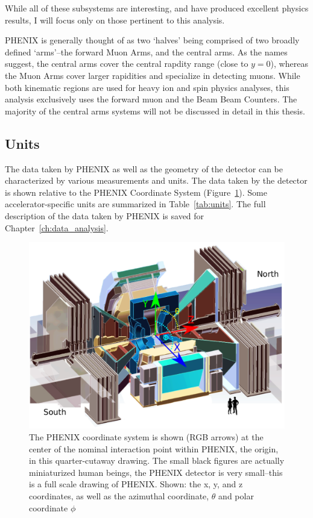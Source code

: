 While all of these subsystems are interesting, and have produced excellent
physics results, I will focus only on those pertinent to this analysis.

PHENIX is generally thought of as two `halves' being comprised of two broadly
defined `arms'--the forward Muon Arms, and the central arms. As the names
suggest, the central arms cover the central rapdity range (close to $y=0$),
whereas the Muon Arms cover larger rapidities and specialize in detecting muons.
While both kinematic regions are used for heavy ion and spin physics analyses,
this analysis exclusively uses the forward muon and the Beam Beam Counters. The
majority of the central arms systems will not be discussed in detail in this
thesis.

\subsection{Units}

The data taken by PHENIX as well as the geometry of the detector can be
characterized by various measurements and units. The data taken by the detector
is shown relative to the PHENIX Coordinate System
(Figure~\ref{fig:phenix_coordinate_system}). Some accelerator-specific units
are summarized in Table~\ref{tab:units}. The full description of the data taken
by PHENIX is saved for Chapter~\ref{ch:data_analysis}.

\begin{figure}[ht]
  \centering
  \includegraphics[width=\linewidth]{./figures/phenix_coordinate_system.png}
  \caption{
    The PHENIX coordinate system is shown (RGB arrows) at the center of the
    nominal interaction point within PHENIX, the origin, in this quarter-cutaway
    drawing. The small black figures are actually miniaturized human beings, the
    PHENIX detector is very small--this is a full scale drawing of PHENIX.
    Shown: the x, y, and z coordinates, as well as the azimuthal coordinate,
    $\theta$ and polar coordinate $\phi$ ~\cite{WebPHENIXDrawings}
  }
  \label{fig:phenix_coordinate_system}

\end{figure}


